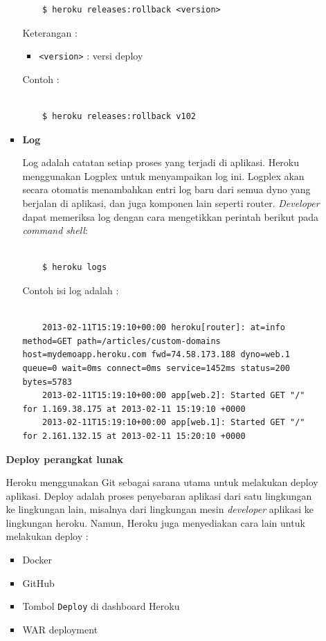 \documentclass[a4paper,twoside]{article}
\begin{document}
\begin{enumerate}
\begin{enumerate}
\begin{itemize}
\begin{lstlisting}
	$ heroku releases:rollback <version>

\end{lstlisting}
Keterangan :
\begin{itemize}
\item \texttt{<version>} : versi deploy
\end{itemize}

Contoh :
\begin{lstlisting}

	$ heroku releases:rollback v102

\end{lstlisting}
		
				\item \textbf{Log}
		
				Log adalah catatan setiap proses yang terjadi di aplikasi. Heroku menggunakan Logplex untuk menyampaikan log ini. Logplex akan secara otomatis menambahkan entri log baru dari semua dyno yang berjalan di aplikasi, dan juga komponen lain seperti router. \textit{Developer} dapat memeriksa log dengan cara mengetikkan perintah berikut pada \textit{command shell}:
\begin{lstlisting}

	$ heroku logs

\end{lstlisting}

Contoh isi log adalah :
\begin{lstlisting}

	2013-02-11T15:19:10+00:00 heroku[router]: at=info method=GET path=/articles/custom-domains host=mydemoapp.heroku.com fwd=74.58.173.188 dyno=web.1 queue=0 wait=0ms connect=0ms service=1452ms status=200 bytes=5783
	2013-02-11T15:19:10+00:00 app[web.2]: Started GET "/" for 1.169.38.175 at 2013-02-11 15:19:10 +0000
	2013-02-11T15:19:10+00:00 app[web.1]: Started GET "/" for 2.161.132.15 at 2013-02-11 15:20:10 +0000

\end{lstlisting}
		
			\end{itemize}
		
			\textbf{Deploy perangkat lunak}
		
			Heroku menggunakan Git sebagai sarana  utama untuk melakukan deploy aplikasi. Deploy adalah proses penyebaran aplikasi dari satu lingkungan ke lingkungan lain, misalnya dari lingkungan mesin \textit{developer} aplikasi ke lingkungan heroku. Namun, Heroku juga menyediakan cara lain untuk melakukan deploy :
\begin{itemize}
\item Docker
\item GitHub
\item Tombol \texttt{Deploy} di dashboard Heroku
\item WAR deployment
\end{itemize}


\end{enumerate}
\end{enumerate}
\end{document}
